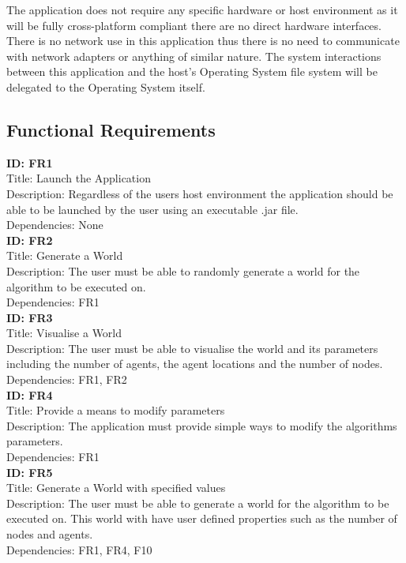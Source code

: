 The application does not require any specific hardware or host environment as it will be fully cross-platform compliant there are no direct hardware interfaces. There is no network use in this application thus there is no need to communicate with network adapters or anything of similar nature. The system interactions between this application and the host's Operating System file system will be delegated to the Operating System itself.

\subsection{Functional Requirements}
\label{funcreq}
\textbf{ID: FR1}\\
Title: Launch the Application\\
Description: Regardless of the users host environment the application should be able to be launched by the user using an executable .jar file.\\
Dependencies: None
\\

\noindent
\textbf{ID: FR2}\\
Title: Generate a World\\
Description: The user must be able to randomly generate a world for the algorithm to be executed on.\\
Dependencies: FR1
\\

\noindent
\textbf{ID: FR3}\\
Title: Visualise a World\\
Description: The user must be able to visualise the world and its parameters including the number of agents, the agent locations and the number of nodes.\\
Dependencies: FR1, FR2
\\

\noindent
\textbf{ID: FR4}\\
Title: Provide a means to modify parameters\\
Description: The application must provide simple ways to modify the algorithms parameters.\\
Dependencies: FR1
\\

\noindent
\textbf{ID: FR5}\\
Title: Generate a World with specified values\\
Description: The user must be able to generate a world for the algorithm to be executed on. This world with have user defined properties such as the number of nodes and agents.\\
Dependencies: FR1, FR4, F10
\\

